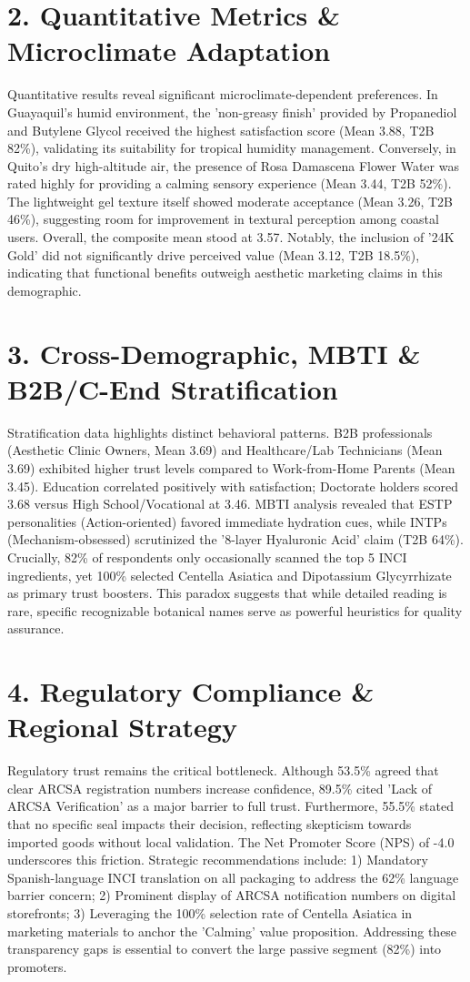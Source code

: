 \documentclass[10pt,twocolumn,a4paper]{article}
\begin{document}
\section{2. Quantitative Metrics \& Microclimate Adaptation}
Quantitative results reveal significant microclimate-dependent preferences. In Guayaquil's humid environment, the 'non-greasy finish' provided by Propanediol and Butylene Glycol received the highest satisfaction score (Mean 3.88, T2B 82\%), validating its suitability for tropical humidity management. Conversely, in Quito's dry high-altitude air, the presence of Rosa Damascena Flower Water was rated highly for providing a calming sensory experience (Mean 3.44, T2B 52\%). The lightweight gel texture itself showed moderate acceptance (Mean 3.26, T2B 46\%), suggesting room for improvement in textural perception among coastal users. Overall, the composite mean stood at 3.57. Notably, the inclusion of '24K Gold' did not significantly drive perceived value (Mean 3.12, T2B 18.5\%), indicating that functional benefits outweigh aesthetic marketing claims in this demographic.
\section{3. Cross-Demographic, MBTI \& B2B/C-End Stratification}
Stratification data highlights distinct behavioral patterns. B2B professionals (Aesthetic Clinic Owners, Mean 3.69) and Healthcare/Lab Technicians (Mean 3.69) exhibited higher trust levels compared to Work-from-Home Parents (Mean 3.45). Education correlated positively with satisfaction; Doctorate holders scored 3.68 versus High School/Vocational at 3.46. MBTI analysis revealed that ESTP personalities (Action-oriented) favored immediate hydration cues, while INTPs (Mechanism-obsessed) scrutinized the '8-layer Hyaluronic Acid' claim (T2B 64\%). Crucially, 82\% of respondents only occasionally scanned the top 5 INCI ingredients, yet 100\% selected Centella Asiatica and Dipotassium Glycyrrhizate as primary trust boosters. This paradox suggests that while detailed reading is rare, specific recognizable botanical names serve as powerful heuristics for quality assurance.
\section{4. Regulatory Compliance \& Regional Strategy}
Regulatory trust remains the critical bottleneck. Although 53.5\% agreed that clear ARCSA registration numbers increase confidence, 89.5\% cited 'Lack of ARCSA Verification' as a major barrier to full trust. Furthermore, 55.5\% stated that no specific seal impacts their decision, reflecting skepticism towards imported goods without local validation. The Net Promoter Score (NPS) of -4.0 underscores this friction. Strategic recommendations include: 1) Mandatory Spanish-language INCI translation on all packaging to address the 62\% language barrier concern; 2) Prominent display of ARCSA notification numbers on digital storefronts; 3) Leveraging the 100\% selection rate of Centella Asiatica in marketing materials to anchor the 'Calming' value proposition. Addressing these transparency gaps is essential to convert the large passive segment (82\%) into promoters.
\end{document}
